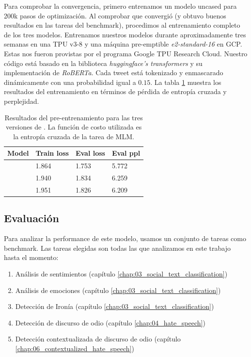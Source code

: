 Para comprobar la convergencia, primero entrenamos un modelo uncased para 200k pasos de optimización. Al comprobar que convergió (y obtuvo buenos resultados en las tareas del benchmark), procedimos al entrenamiento completo de los tres modelos. Entrenamos nuestros modelos durante aproximadamente tres semanas en una TPU v3-8 y una máquina pre-emptible \emph{e2-standard-16} en GCP. Estas nos fueron provistas por el programa Google TPU Research Cloud. Nuestro código está basado en la biblioteca \emph{huggingface's transformers}\cite{wolf-etal-2020-transformers} y su implementación de \emph{RoBERTa}. Cada tweet está tokenizado y enmascarado dinámicamente con una probabilidad igual a $ 0.15 $. La tabla \ref{tab:training_results} muestra los resultados del entrenamiento en términos de pérdida de entropía cruzada y perplejidad.

\begin{table}[t]
    \centering
    \begin{tabular}{l l l l}
        Model   & Train loss & Eval loss   & Eval ppl \\
        \hline
        \cased{}   & 1.864      & 1.753       & 5.772    \\
        \uncased{} & 1.940      & 1.834       & 6.259    \\
        \deacc{}   & 1.951      & 1.826       & 6.209    \\
        \hline
    \end{tabular}
    \caption{Resultados del pre-entrenamiento para las tres versiones de \robertuito{}. La función de costo utilizada es la entropía cruzada de la tarea de MLM.}
    \label{tab:training_results}
\end{table}


\subsection{Evaluación}

Para analizar la performance de este modelo, usamos un conjunto de tareas como benchmark. Las tareas elegidas son todas las que analizamos en este trabajo hasta el momento:

\begin{enumerate}
    \item Análisis de sentimientos (capítulo \ref{chap:03_social_text_classification})
    \item Análisis de emociones (capítulo \ref{chap:03_social_text_classification})
    \item Detección de Ironía (capítulo \ref{chap:03_social_text_classification})
    \item Detección de discurso de odio (capítulo \ref{chap:04_hate_speech})
    \item Detección contextualizada de discurso de odio (capítulo \ref{chap:06_contextualized_hate_speech})
\end{enumerate}



